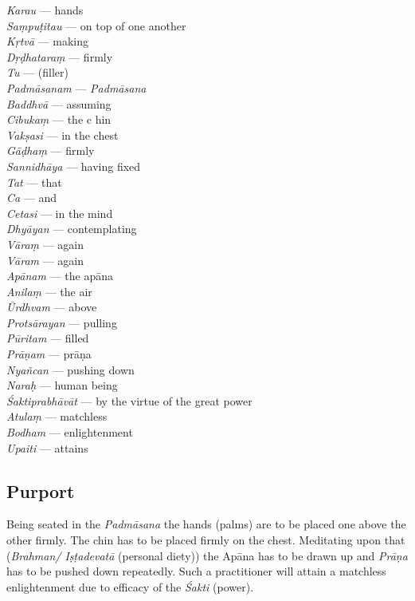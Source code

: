 \begin{multicols}{2}
\textit{Karau}  ---  hands \\
\textit{Saṃpuṭitau} ---  on top of one another \\
\textit{Kṛtvā} ---  making \\
\textit{Dṛḍhataraṃ} ---  firmly \\
\textit{Tu} ---  (filler)  \\
\textit{Padmāsanam} ---  \textit{Padmāsana} \\
\textit{Baddhvā} ---  assuming  \\
\textit{Cibukaṃ} ---  the c	hin  \\
\textit{Vakṣasi} ---  in the chest \\ 
\textit{Gāḍhaṃ} ---  firmly  \\
\textit{Sannidhāya} ---  having fixed  \\
\textit{Tat} --- that  \\
\textit{Ca} ---   and  \\
\textit{Cetasi} --- in the mind   \\
\textit{Dhyāyan} ---  contemplating \\  
\textit{Vāraṃ} ---  again  \\
\textit{Vāram} ---  again  \\
\textit{Apānam} ---  the apāna \\
\textit{Anilaṃ} ---  the air  \\
\textit{Ūrdhvam} ---  above  \\
\textit{Protsārayan} ---  pulling  \\
\textit{Pūritam} ---  filled  \\
\textit{Prāṇam} ---  prāṇa \\
\textit{Nyañcan} ---  pushing down  \\
\textit{Naraḥ} --- human being  \\
\textit{Śaktiprabhāvāt} ---  by the virtue of the great power  \\
\textit{Atulaṃ} ---  matchless  \\
\textit{Bodham} ---  enlightenment  \\
\textit{Upaiti} ---  attains
\end{multicols}

\subsection*{Purport}

Being seated in the \textit{Padmāsana} the hands (palms) are to be placed one above the other firmly. The chin has to be placed firmly on the chest. Meditating upon that (\textit{Brahman/ Iṣṭadevatā} (personal diety)) the Apāna has to be drawn up and \textit{Prāṇa} has to be pushed down repeatedly. Such a practitioner will attain a matchless enlightenment due to efficacy of the \textit{Śakti} (power).

